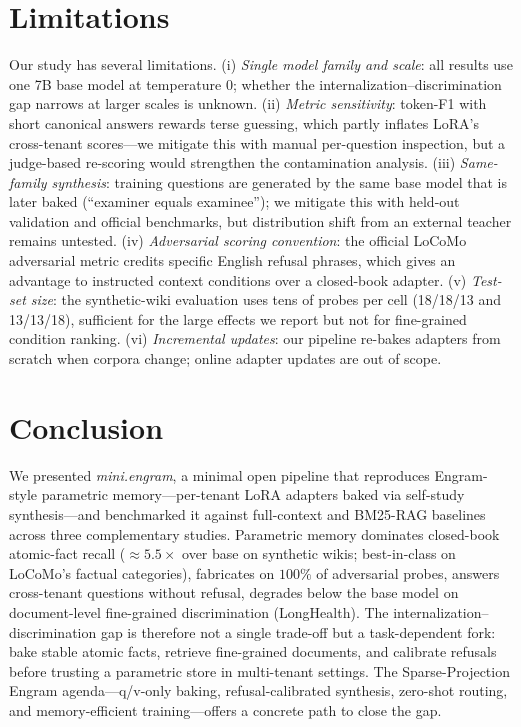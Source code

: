 \documentclass[conference]{IEEEtran}
\begin{document}
\section{Limitations}
Our study has several limitations. (i) \textit{Single model family and scale}: all results use one 7B base model at temperature $0$; whether the internalization--discrimination gap narrows at larger scales is unknown. (ii) \textit{Metric sensitivity}: token-F1 with short canonical answers rewards terse guessing, which partly inflates LoRA's cross-tenant scores---we mitigate this with manual per-question inspection, but a judge-based re-scoring would strengthen the contamination analysis. (iii) \textit{Same-family synthesis}: training questions are generated by the same base model that is later baked (``examiner equals examinee''); we mitigate this with held-out validation and official benchmarks, but distribution shift from an external teacher remains untested. (iv) \textit{Adversarial scoring convention}: the official LoCoMo adversarial metric credits specific English refusal phrases, which gives an advantage to instructed context conditions over a closed-book adapter. (v) \textit{Test-set size}: the synthetic-wiki evaluation uses tens of probes per cell (18/18/13 and 13/13/18), sufficient for the large effects we report but not for fine-grained condition ranking. (vi) \textit{Incremental updates}: our pipeline re-bakes adapters from scratch when corpora change; online adapter updates are out of scope.

\section{Conclusion}
We presented \textit{mini.engram}, a minimal open pipeline that reproduces Engram-style parametric memory---per-tenant LoRA adapters baked via self-study synthesis---and benchmarked it against full-context and BM25-RAG baselines across three complementary studies. Parametric memory dominates closed-book atomic-fact recall ($\approx 5.5\times$ over base on synthetic wikis; best-in-class on LoCoMo's factual categories), fabricates on $100\%$ of adversarial probes, answers cross-tenant questions without refusal, degrades below the base model on document-level fine-grained discrimination (LongHealth). The internalization--discrimination gap is therefore not a single trade-off but a task-dependent fork: bake stable atomic facts, retrieve fine-grained documents, and calibrate refusals before trusting a parametric store in multi-tenant settings. The Sparse-Projection Engram agenda---q/v-only baking, refusal-calibrated synthesis, zero-shot routing, and memory-efficient training---offers a concrete path to close the gap.
\end{document}
